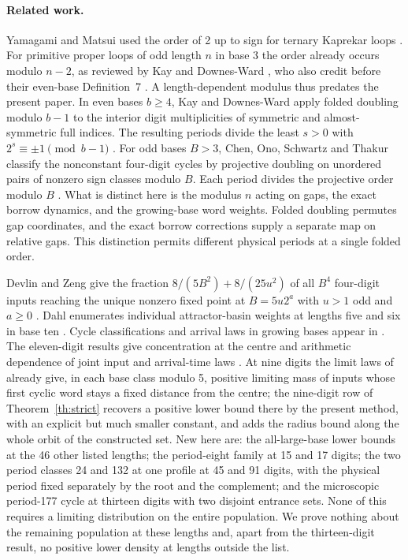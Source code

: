 \documentclass[11pt,reqno]{amsart}
\theoremstyle{remark}
\begin{document}
\paragraph{Related work.}
Yamagami and Matsui used the order of 2 up to sign for ternary Kaprekar
loops \cite{YM}. For primitive proper loops of odd length \(n\) in base 3
the order already occurs modulo \(n-2\), as reviewed by Kay and
Downes-Ward \cite[Section~2]{KDO}, who also credit \cite{YM} before
their even-base Definition~7 \cite{KDE}.
A length-dependent modulus thus predates the present paper.
In even bases \(b\ge4\), Kay and Downes-Ward apply folded doubling
modulo \(b-1\) to the interior digit multiplicities of symmetric and
almost-symmetric full indices. The resulting periods divide the least
\(s>0\) with \(2^s\equiv\pm1\pmod{b-1}\)
\cite[Theorem~5(c), Definition~7 and Theorem~9]{KDE}. For odd bases
\(B>3\), Chen, Ono, Schwartz and Thakur classify the nonconstant
four-digit cycles by projective doubling on unordered pairs of nonzero
sign classes modulo \(B\). Each period divides the projective order
modulo \(B\) \cite[Theorem~1 and proof of Lemma~20]{COST}.
What is distinct here is the modulus \(n\) acting on gaps, the exact
borrow dynamics, and the growing-base word weights. Folded doubling
permutes gap coordinates, and the exact borrow corrections supply a
separate map on relative gaps. This distinction permits different
physical periods at a single folded order.

Devlin and Zeng give the fraction \(8/(5B^2)+8/(25u^2)\)
of all \(B^4\) four-digit inputs reaching the unique nonzero fixed
point at \(B=5u2^a\) with \(u>1\) odd and \(a\ge0\) \cite[Theorem~2]{DZ}.
Dahl enumerates individual attractor-basin weights at lengths five and
six in base ten \cite[Section~3.1 and Appendix~A.3]{Dahl}.
Cycle classifications and arrival laws in growing bases appear in
\cite{G1,G2,G3,G5}. The eleven-digit results give concentration at
the centre and arithmetic dependence of joint input and arrival-time
laws \cite{G6,G7,G8}. At nine digits the limit laws of
\cite[Theorem~2]{G4} already give, in each base class modulo 5, positive
limiting mass of inputs whose first cyclic word stays a fixed distance
from the centre; the nine-digit row of Theorem~\ref{th:strict} recovers
a positive lower bound there by the present method, with an explicit
but much smaller constant, and adds the radius bound along the whole
orbit of the constructed set. New here are: the all-large-base lower
bounds at the 46 other listed lengths; the period-eight family at 15
and 17 digits; the two period classes 24 and 132 at one profile at 45
and 91 digits, with the physical period fixed separately by the root
and the complement; and the microscopic period-177 cycle at thirteen digits
with two disjoint entrance sets. None of this requires a limiting
distribution on the entire population. We prove nothing about the
remaining population at these lengths and, apart from the
thirteen-digit result, no positive lower density at lengths outside
the list.
\end{document}
